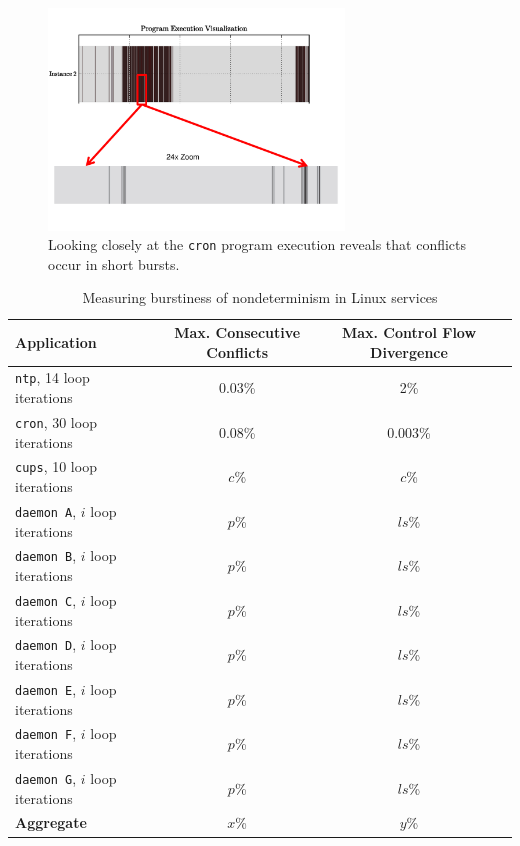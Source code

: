 \begin{figure}
  \center
  \includegraphics[trim=0cm 0cm 0cm 0cm, width=0.7\textwidth]{cronzoom-ch2.pdf}
  \caption[Understanding nature of conflicts in \texttt{cron}]%
  {Looking closely at the \texttt{cron} program execution reveals
    that conflicts occur in short bursts.}
  \label{cron:zoomtracech2}
\end{figure} 

\begin{table}
\caption{Measuring burstiness of nondeterminism in Linux services} 
\label{burst:stats}
\begin{center}
\begin{tabular}{||l|c|c|c||}\hline
  Application & Max. Consecutive Conflicts & Max. Control Flow Divergence \\
  \hline \hline
  \texttt{ntp}, 14 loop iterations & 0.03\% & 2\% 
  \\\hline
  \texttt{cron}, 30 loop iterations & 0.08\% & 0.003\% 
  \\\hline 
  \texttt{cups}, 10 loop iterations & $c$\% & $c$\% 
  \\\hline 
  \texttt{daemon A}, $i$ loop iterations & $p$\% & $ls$\% 
  \\\hline 
  \texttt{daemon B}, $i$ loop iterations & $p$\% & $ls$\% 
  \\\hline 
  \texttt{daemon C}, $i$ loop iterations & $p$\% & $ls$\% 
  \\\hline 
  \texttt{daemon D}, $i$ loop iterations & $p$\% & $ls$\% 
  \\\hline 
  \texttt{daemon E}, $i$ loop iterations & $p$\% & $ls$\% 
  \\\hline 
  \texttt{daemon F}, $i$ loop iterations & $p$\% & $ls$\% 
  \\\hline 
  \texttt{daemon G}, $i$ loop iterations & $p$\% & $ls$\% 
  \\\hline 
  \hline 
  {\bf Aggregate} & {\bf $x$}\% & {\bf $y$}\% %
  \\\hline 
\end{tabular}
\end{center}
\end{table}


